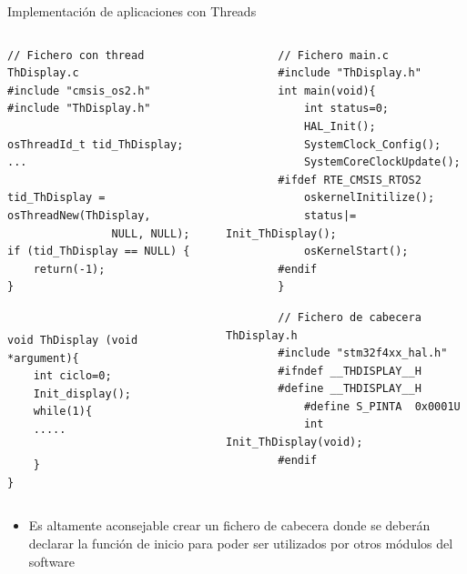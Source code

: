 \begin{frame}[fragile]{Implementación de aplicaciones con Threads}
    \begin{columns}
        \begin{column}{0.50\textwidth}
            \begin{verbatim}
// Fichero con thread ThDisplay.c
#include "cmsis_os2.h"
#include "ThDisplay.h"

osThreadId_t tid_ThDisplay; 
...

tid_ThDisplay = osThreadNew(ThDisplay, 
                NULL, NULL);
if (tid_ThDisplay == NULL) {
    return(-1);
}


void ThDisplay (void *argument){
    int ciclo=0;
    Init_display();
    while(1){
    .....
    
    }
}
            \end{verbatim}
        \end{column}
    \begin{column}{0.50\textwidth}
        \begin{verbatim}
        // Fichero main.c
        #include "ThDisplay.h"
        int main(void){
            int status=0;
            HAL_Init();
            SystemClock_Config();
            SystemCoreClockUpdate();
        #ifdef RTE_CMSIS_RTOS2
            oskernelInitilize();
            status|= Init_ThDisplay();
            osKernelStart();
        #endif
        }
        \end{verbatim}
        \begin{verbatim}
        // Fichero de cabecera  ThDisplay.h    
        #include "stm32f4xx_hal.h"     
        #ifndef __THDISPLAY__H
        #define __THDISPLAY__H
            #define S_PINTA  0x0001U
            int Init_ThDisplay(void);
        #endif
        \end{verbatim}
    \end{column}
    \end{columns}
    \begin{itemize}
        \item Es altamente aconsejable crear un fichero de cabecera donde se deberán declarar la función de inicio para poder ser utilizados por otros módulos del software
    \end{itemize}
\end{frame}

